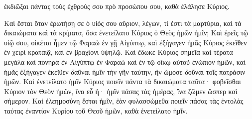 {ἐκδιῶξαι πάντας τοὺς ἐχθρούς σου πρὸ προσώπου σου, καθὰ ἐλάλησε Κύριος.
\par }{\PP {}Καὶ ἔσται ὅταν ἐρωτήσῃ σε ὁ υἱός σου αὔριον, λέγων, τί ἐστι τὰ μαρτύρια, καὶ τὰ δικαιώματα καὶ τὰ κρίματα, ὅσα ἐνετείλατο Κύριος ὁ Θεὸς ἡμῶν ἡμῖν;
Καὶ ἐρεῖς τῷ υἱῷ σου, οἰκέται ἦμεν τῷ Φαραὼ ἐν γῇ Αἰγύπτῳ, καὶ ἐξήγαγεν ἡμᾶς Κύριος ἐκεῖθεν ἐν χειρὶ κραταιᾷ, καὶ ἐν βραχίονι ὑψηλῷ.
Καὶ ἔδωκε Κύριος σημεῖα καὶ τέρατα μεγάλα καὶ πονηρὰ ἐν Αἰγύπτῳ ἐν Φαραὼ καὶ ἐν τῷ οἴκῳ αὐτοῦ ἐνώπιον ἡμῶν,
καὶ ἡμᾶς ἐξήγαγεν ἐκεῖθεν δαῦναι ἡμῖν τὴν γῆν ταύτην, ἣν ὤμοσε δοῦναι τοῖς πατράσιν ἡμῶν.
Καὶ ἐνετείλατο ἡμῖν Κύριος ποιεῖν πάντα τὰ δικαιώματα ταῦτα· φοβεῖσθαι Κύριον τὸν Θεὸν ἡμῶν, ἵνα εὖ ἠ· ἡμῖν πάσας τὰς ἡμέρας, ἵνα ζῶμεν ὥσπερ καὶ σήμερον.
Καὶ ἐλεημοσύνη ἔσται ἡμῖν, ἐὰν φυλασσώμεθα ποιεῖν πάσας τὰς ἐντολὰς ταύτας ἐναντίον Κυρίου τοῦ Θεοῦ ἡμῶν, καθὰ ἐνετείλατο ἡμῖν.

}
